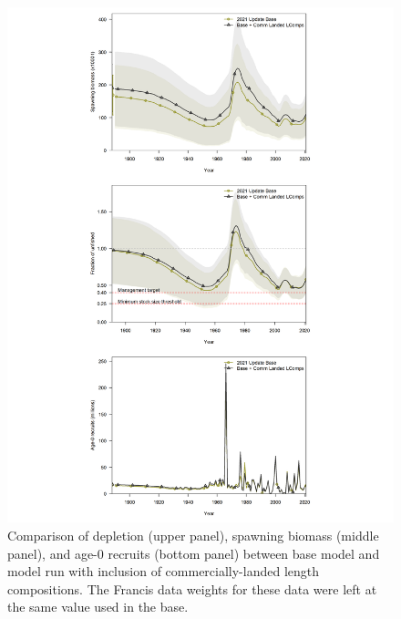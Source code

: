 \documentclass[11pt,
  english,
  a4paper,
]{article}
\begin{document}
\begin{figure}
\centering
\includegraphics[width=1\textwidth,height=1\textheight]{figs/commL_sens.png}
\caption{Comparison of depletion (upper panel), spawning biomass (middle panel), and age-0 recruits (bottom panel) between base model and model run with inclusion of commercially-landed length compositions. The Francis data weights for these data were left at the same value used in the base. \label{fig:commL}}
\end{figure}

\tagmcend\tagstructend

\end{document}
